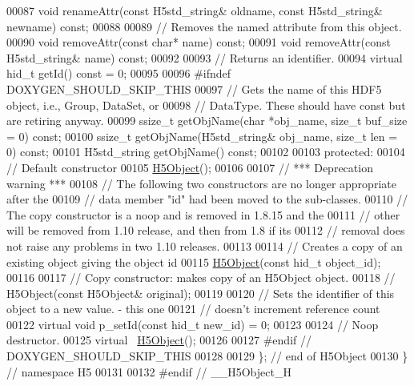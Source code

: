 \begin{DoxyCode}
00087         \textcolor{keywordtype}{void} renameAttr(\textcolor{keyword}{const} H5std\_string& oldname, \textcolor{keyword}{const} H5std\_string& newname) \textcolor{keyword}{const};
00088 
00089         \textcolor{comment}{// Removes the named attribute from this object.}
00090         \textcolor{keywordtype}{void} removeAttr(\textcolor{keyword}{const} \textcolor{keywordtype}{char}* name) \textcolor{keyword}{const};
00091         \textcolor{keywordtype}{void} removeAttr(\textcolor{keyword}{const} H5std\_string& name) \textcolor{keyword}{const};
00092 
00093         \textcolor{comment}{// Returns an identifier.}
00094         \textcolor{keyword}{virtual} hid\_t getId() \textcolor{keyword}{const} = 0;
00095 
00096 \textcolor{preprocessor}{#ifndef DOXYGEN\_SHOULD\_SKIP\_THIS}
00097         \textcolor{comment}{// Gets the name of this HDF5 object, i.e., Group, DataSet, or}
00098         \textcolor{comment}{// DataType.  These should have const but are retiring anyway.}
00099         ssize\_t getObjName(\textcolor{keywordtype}{char} *obj\_name, \textcolor{keywordtype}{size\_t} buf\_size = 0) \textcolor{keyword}{const};
00100         ssize\_t getObjName(H5std\_string& obj\_name, \textcolor{keywordtype}{size\_t} len = 0) \textcolor{keyword}{const};
00101         H5std\_string getObjName() \textcolor{keyword}{const};
00102 
00103    \textcolor{keyword}{protected}:
00104         \textcolor{comment}{// Default constructor}
00105         \hyperlink{class_h5_1_1_h5_object}{H5Object}();
00106 
00107         \textcolor{comment}{// *** Deprecation warning ***}
00108         \textcolor{comment}{// The following two constructors are no longer appropriate after the}
00109         \textcolor{comment}{// data member "id" had been moved to the sub-classes.}
00110         \textcolor{comment}{// The copy constructor is a noop and is removed in 1.8.15 and the}
00111         \textcolor{comment}{// other will be removed from 1.10 release, and then from 1.8 if its}
00112         \textcolor{comment}{// removal does not raise any problems in two 1.10 releases.}
00113 
00114         \textcolor{comment}{// Creates a copy of an existing object giving the object id}
00115         \hyperlink{class_h5_1_1_h5_object}{H5Object}(\textcolor{keyword}{const} hid\_t object\_id);
00116 
00117         \textcolor{comment}{// Copy constructor: makes copy of an H5Object object.}
00118         \textcolor{comment}{// H5Object(const H5Object& original);}
00119 
00120         \textcolor{comment}{// Sets the identifier of this object to a new value. - this one}
00121         \textcolor{comment}{// doesn't increment reference count}
00122         \textcolor{keyword}{virtual} \textcolor{keywordtype}{void} p\_setId(\textcolor{keyword}{const} hid\_t new\_id) = 0;
00123 
00124         \textcolor{comment}{// Noop destructor.}
00125         \textcolor{keyword}{virtual} ~\hyperlink{class_h5_1_1_h5_object}{H5Object}();
00126 
00127 \textcolor{preprocessor}{#endif // DOXYGEN\_SHOULD\_SKIP\_THIS}
00128 
00129 \}; \textcolor{comment}{// end of H5Object}
00130 \} \textcolor{comment}{// namespace H5}
00131 
00132 \textcolor{preprocessor}{#endif // \_\_H5Object\_H}
\end{DoxyCode}
